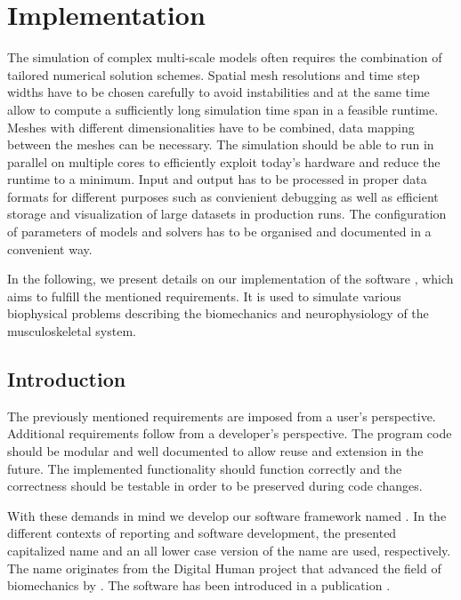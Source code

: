 \chapter{Implementation}\label{sec:implementation}

The simulation of complex multi-scale models often requires the combination of tailored numerical solution schemes. Spatial mesh resolutions and time step widths have to be chosen carefully to avoid instabilities and at the same time allow to compute a sufficiently long simulation time span in a feasible runtime.
Meshes with different dimensionalities have to be combined, data mapping between the meshes can be necessary. 
The simulation should be able to run in parallel on multiple cores to efficiently exploit today's hardware and reduce the runtime to a minimum. Input and output has to be processed in proper data formats for different purposes such as convienient debugging as well as efficient storage and visualization of large datasets in production runs. The configuration of parameters of models and solvers has to be organised and documented in a convenient way.

In the following, we present details on our implementation of the software \opendihu{}, which aims to fulfill the mentioned requirements. It is used to simulate various biophysical problems describing the biomechanics and neurophysiology of the musculoskeletal system.

\section{Introduction}

The previously mentioned requirements are imposed from a user's perspective. 
Additional requirements follow from a developer's perspective. The program code should be modular and well documented to allow reuse and extension in the future. The implemented functionality should function correctly and the correctness should be testable in order to be preserved during code changes.

With these demands in mind we develop our software framework named \emph{\opendihu{}}. In the different contexts of reporting and software development, the presented capitalized name and an all lower case version of the name are used, respectively. The name originates from the Digital Human project that advanced the field of biomechanics by  \cite{DihuWeb}.
The software has been introduced in a publication \cite{Maier2019}.

